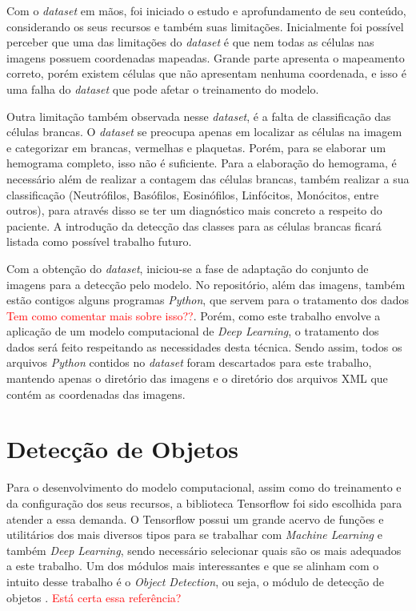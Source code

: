 Com o \emph{dataset} em mãos, foi iniciado o estudo e aprofundamento de seu conteúdo, considerando os seus recursos e também suas limitações. Inicialmente foi possível perceber que uma das limitações do \emph{dataset} é que nem todas as células nas imagens possuem coordenadas mapeadas. Grande parte apresenta o mapeamento correto, porém existem células que não apresentam nenhuma coordenada, e isso é uma falha do \emph{dataset} que pode afetar o treinamento do modelo.

Outra limitação também observada nesse \emph{dataset}, é a falta de classificação das células brancas. O \emph{dataset} se preocupa apenas em localizar as células na imagem e categorizar em brancas, vermelhas e plaquetas. Porém, para se elaborar um hemograma completo, isso não é suficiente. Para a elaboração do hemograma, é necessário além de realizar a contagem das células brancas, também realizar a sua classificação (Neutrófilos, Basófilos, Eosinófilos, Linfócitos, Monócitos, entre outros), para através disso se ter um diagnóstico mais concreto a respeito do paciente. A introdução da detecção das classes para as células brancas ficará listada como possível trabalho futuro.

Com a obtenção do \emph{dataset}, iniciou-se a fase de adaptação do conjunto de imagens para a detecção pelo modelo. No repositório, além das imagens, também estão contigos alguns programas \emph{Python}, que servem para o tratamento dos dados \textcolor{red}{Tem como comentar mais sobre isso??}. Porém, como este trabalho envolve a aplicação de um modelo computacional de \emph{Deep Learning}, o tratamento dos dados será feito respeitando as necessidades desta técnica. Sendo assim, todos os arquivos \emph{Python} contidos no \emph{dataset} foram descartados para este trabalho, mantendo apenas o diretório das imagens e o diretório dos arquivos XML que contém as coordenadas das imagens.

\section{Detecção de Objetos}
Para o desenvolvimento do modelo computacional, assim como do treinamento e da configuração dos seus recursos, a biblioteca Tensorflow foi sido escolhida para atender a essa demanda. O Tensorflow possui um grande acervo de funções e utilitários dos mais diversos tipos para se trabalhar com \emph{Machine Learning} e também \emph{Deep Learning}, sendo necessário selecionar quais são os mais adequados a este trabalho. Um dos módulos mais interessantes e que se alinham com o intuito desse trabalho é o \emph{Object Detection}, ou seja, o módulo de detecção de objetos \cite{websiteObjectDetection}. \textcolor{red}{Está certa essa referência?}

